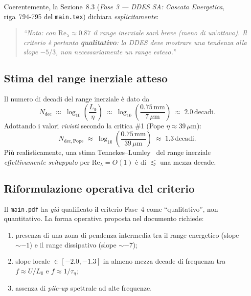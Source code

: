 \documentclass[11pt,a4paper]{article}
\newcommand{\Rey}{\mathrm{Re}}
\newcommand{\mum}{\,\mu\mathrm{m}}
\begin{document}
Coerentemente, la Sezione~8.3 (\emph{Fase 3 --- DDES SA: Cascata
Energetica}, riga~794-795 del \texttt{main.tex}) dichiara
\emph{esplicitamente}:

\begin{quote}\small\itshape
``Nota: con $\Rey_{\lambda}\approx 0.87$ il range inerziale sarà
breve (meno di un'ottava). Il criterio è pertanto \textbf{qualitativo}:
la DDES deve mostrare una tendenza alla slope $-5/3$, non
necessariamente un range esteso.''
\end{quote}

\subsection{Stima del range inerziale atteso}

Il numero di decadi del range inerziale è dato da
\begin{equation}
  N_{\mathrm{dec}} \;\approx\;
   \log_{10}\!\left(\frac{L_{0}}{\eta}\right)
   \;\approx\; \log_{10}\!\left(\frac{0.75\,\mathrm{mm}}{7\mum}\right)
   \;\approx\; 2.0\,\mathrm{decadi}.
\end{equation}
Adottando i valori \emph{rivisti} secondo la critica \#1 (Pope
$\eta\approx 39\mum$):
\begin{equation}
  N_{\mathrm{dec},\mathrm{Pope}} \;\approx\;
   \log_{10}\!\left(\frac{0.75\,\mathrm{mm}}{39\mum}\right)
   \;\approx\; 1.3\,\mathrm{decadi}.
\end{equation}
Più realisticamente, una stima Tennekes--Lumley~\cite{Tennekes1972}
del range inerziale \emph{effettivamente sviluppato} per
$\Rey_{\lambda}=O(1)$ è di $\lesssim$ una mezza decade.

\subsection{Riformulazione operativa del criterio}

Il \texttt{main.pdf} ha \emph{già} qualificato il criterio Fase~4
come ``qualitativo'', non quantitativo. La forma operativa proposta
nel documento richiede:

\begin{enumerate}
  \item presenza di una zona di pendenza intermedia tra il range
    energetico (slope $\sim -1$) e il range dissipativo
    (slope $\sim -7$);
  \item slope locale $\in [-2.0, -1.3]$ in almeno mezza decade di
    frequenza tra $f \approx U/L_{0}$ e $f \approx 1/\tau_{\eta}$;
  \item assenza di \emph{pile-up} spettrale ad alte frequenze.
\end{enumerate}
\end{document}
